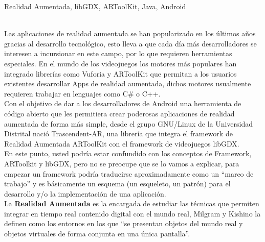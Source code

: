 \begin{multicols}{2}



 Realidad Aumentada, libGDX, ARToolKit, Java, Android



\\
Las aplicaciones de realidad aumentada se han popularizado en los últimos años gracias al desarrollo tecnológico, esto lleva a que cada día más desarrolladores se interesen a incursionar en este campo, por lo que requieren herramientas especiales. En el mundo de los videojuegos los motores más populares han integrado librerías como Vuforia y ARToolKit que permitan a los usuarios existentes desarrollar Apps de realidad aumentada, dichos motores usualmente requieren trabajar en lenguajes como C\# o C++.\\ 

Con el objetivo de dar a los desarrolladores de Android una herramienta de código abierto que les permitiera crear poderosas aplicaciones de realidad aumentada de forma más simple, desde el grupo GNU/Linux de la Universidad Distrital nació Trascendent-AR, una librería que integra el framework de Realidad Aumentada ARToolKit con el framework de videojuegos libGDX.\\

En este punto, usted podría estar confundido con los conceptos de Framework, ARToolkit y libGDX, pero no se preocupe que se lo vamos a explicar, para empezar un framework podría traducirse aproximadamente como un “marco de trabajo” y es básicamente un esquema (un esqueleto, un patrón) para el desarrollo y/o la implementación de una aplicación.
\\

La \textbf {Realidad Aumentada} es la encargada de estudiar las técnicas que permiten integrar en tiempo real contenido digital con el mundo real, Milgram y Kishino la definen como los entornos en los que “se presentan objetos del mundo real y objetos virtuales de forma conjunta en una única pantalla”. \cite{libroRA}


\end{multicols}

